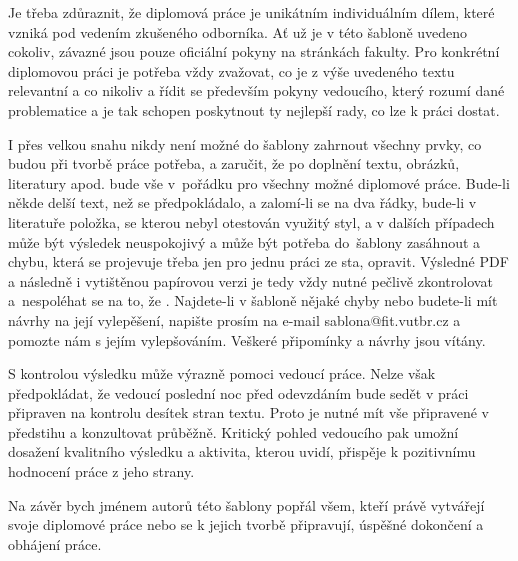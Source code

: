Je třeba zdůraznit, že diplomová práce je unikátním individuálním dílem, které vzniká pod vedením zkušeného odborníka. Ať už je v této šabloně uvedeno cokoliv, závazné jsou pouze oficiální pokyny na stránkách fakulty. Pro konkrétní diplomovou práci je potřeba vždy zvažovat, co je z výše uvedeného textu relevantní a co nikoliv a řídit se především pokyny vedoucího, který rozumí dané problematice a je tak schopen poskytnout ty nejlepší rady, co lze k práci dostat.

I přes velkou snahu nikdy není možné do šablony zahrnout všechny prvky, co budou při tvorbě práce potřeba, a zaručit, že po doplnění textu, obrázků, literatury apod. bude vše v~pořádku pro všechny možné diplomové práce. Bude-li někde delší text, než se předpokládalo, a zalomí-li se na dva řádky, bude-li v literatuře položka, se kterou nebyl otestován využitý styl, a v dalších případech může být výsledek neuspokojivý a může být potřeba do~šablony zasáhnout a chybu, která se projevuje třeba jen pro jednu práci ze sta, opravit. Výsledné PDF a následně i vytištěnou papírovou verzi je tedy vždy nutné pečlivě zkontrolovat a~nespoléhat se na to, že . Najdete-li v šabloně nějaké chyby nebo budete-li mít návrhy na její vylepěšení, napište prosím na e-mail sablona@fit.vutbr.cz a pomozte nám s jejím vylepšováním. Veškeré připomínky a návrhy jsou vítány.

S kontrolou výsledku může výrazně pomoci vedoucí práce. Nelze však předpokládat, že vedoucí poslední noc před odevzdáním bude sedět v práci připraven na kontrolu desítek stran textu. Proto je nutné mít vše připravené v předstihu a konzultovat průběžně. Kritický pohled vedoucího pak umožní dosažení kvalitního výsledku a aktivita, kterou uvidí, přispěje k pozitivnímu hodnocení práce z jeho strany.

Na závěr bych jménem autorů této šablony popřál všem, kteří právě vytvářejí svoje diplomové práce nebo se k jejich tvorbě připravují, úspěšné dokončení a obhájení práce.






